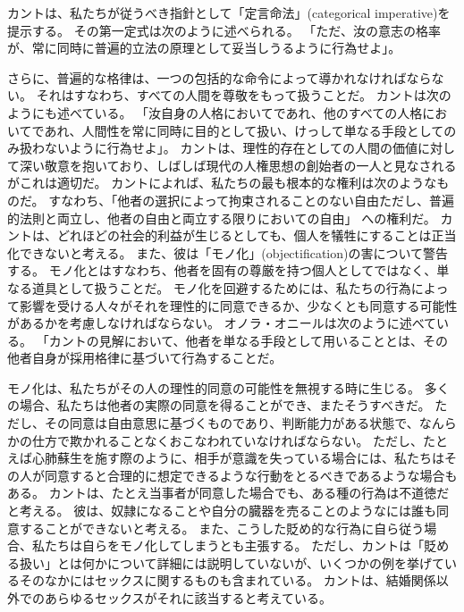 \documentclass[paper=a4,book,openany]{jlreq} \usepackage{mystyle}
\begin{document}
カントは、私たちが従うべき指針として「定言命法」(categorical imperative)を提示する。
その第一定式は次のように述べられる。
「ただ、汝の意志の格率が、常に同時に普遍的立法の原理として妥当しうるように行為せよ」\citep[4:421, p.34]{kant11:_groun_metap_moral}。
\nocite{カント24:基礎づけ}

さらに、普遍的な格律は、一つの包括的な命令によって導かれなければならない。
それはすなわち、すべての人間を尊敬をもって扱うことだ。
カントは次のようにも述べている。
「汝自身の人格においてであれ、他のすべての人格においてであれ、人間性を常に同時に目的として扱い、けっして単なる手段としてのみ扱わないように行為せよ」\citep[4:429, p.41]{kant11:_groun_metap_moral}。
カントは、理性的存在としての人間の価値に対して深い敬意を抱いており、しばしば現代の人権思想の創始者の一人と見なされるがこれは適切だ。
カントによれば、私たちの最も根本的な権利は次のようなものだ。
すなわち、「他者の選択によって拘束されることのない自由{\DDASH}ただし、普遍的法則と両立し、他者の自由と両立する限りにおいての自由」\citep[6:237]{kant96:_metap_moral}\nocite{カント24:人倫徳論}
への権利だ。
カントは、どれほどの社会的利益が生じるとしても、個人を犠牲にすることは正当化できないと考える。
また、彼は「モノ化」(objectification)の害について警告する。
モノ化とはすなわち、他者を固有の尊厳を持つ個人としてではなく、単なる道具として扱うことだ。
モノ化を回避するためには、私たちの行為によって影響を受ける人々がそれを理性的に同意できるか、少なくとも同意する可能性があるかを考慮しなければならない。
オノラ・オニールは次のように述べている。
「カントの見解において、他者を単なる手段として用いることとは、その他者自身が採用格律に基づいて行為することだ\citep[p.138]{oneill89:_const_reason}。

モノ化は、私たちがその人の理性的同意の可能性を無視する時に生じる。
多くの場合、私たちは他者の実際の同意を得ることができ、またそうすべきだ。
ただし、その同意は自由意思に基づくものであり、判断能力がある状態で、なんらかの仕方で欺かれることなくおこなわれていなければならない。
ただし、たとえば心肺蘇生を施す際のように、相手が意識を失っている場合には、私たちはその人が同意すると合理的に想定できるような行動をとるべきであるような場合もある。
カントは、たとえ当事者が同意した場合でも、ある種の行為は不道徳だと考える。
彼は、奴隷になることや自分の臓器を売ることのようなには誰も同意することができないと考える。
また、こうした貶め的な行為に自ら従う場合、私たちは自らをモノ化してしまうとも主張する。
ただし、カントは「貶める扱い」とは何かについて詳細には説明していないが、いくつかの例を挙げている{\DDASH}そのなかにはセックスに関するものも含まれている。
カントは、結婚関係以外でのあらゆるセックスがそれに該当すると考えている。
\end{document}
